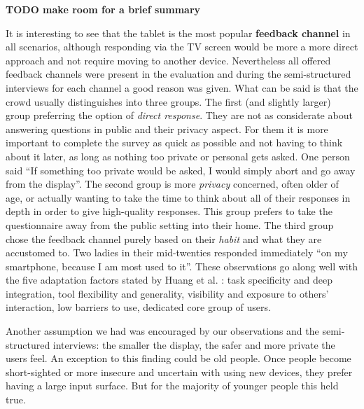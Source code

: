 	\textbf{TODO make room for a brief summary}




	It is interesting to see that the tablet is the most popular \textbf{feedback channel} in all scenarios, although responding via the TV screen would be more a more direct approach and not require moving to another device. 
	Nevertheless all offered feedback channels were present in the evaluation and during the semi-structured interviews for each channel a good reason was given. What can be said is that the crowd usually distinguishes into three groups. The first (and slightly larger) group preferring the option of \textit{direct response}. They are not as considerate about answering questions in public and their privacy aspect. For them it is more important to complete the survey as quick as possible and not having to think about it later, as long as nothing too private or personal gets asked. One person said ``If something too private would be asked, I would simply abort and go away from the display''. The second group is more \textit{privacy} concerned, often older of age, or actually wanting to take the time to think about all of their responses in depth in order to give high-quality responses. This group prefers to take the questionnaire away from the public setting into their home. The third group chose the feedback channel purely based on their \textit{habit} and what they are accustomed to. Two ladies in their mid-twenties responded immediately ``on my smartphone, because I am most used to it''.
	These observations go along well with the five adaptation factors stated by Huang et al. \cite{Huang2004}: task specificity and deep integration, tool flexibility and generality, visibility and exposure to others' interaction, low barriers to use, dedicated core group of users.

	Another assumption we had was encouraged by our observations and the semi-structured interviews: the smaller the display, the safer and more private the users feel. An exception to this finding could be old people. Once people become short-sighted or more insecure and uncertain with using new devices, they prefer having a large input surface. But for the majority of younger people this held true.

